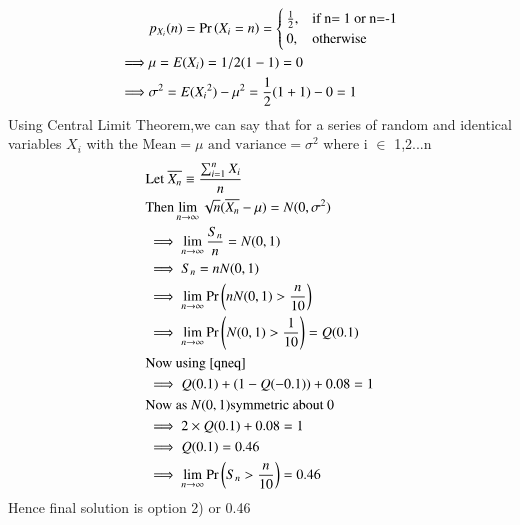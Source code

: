 
\begin{align}
   &p_{X_i} (n)=\Pr\left(X_i = n\right)=\nonumber \begin{cases}
            \frac{1}{2}, &\text{if n= 1 or n=-1}\\
             0, &\text{otherwise}\\
            \end{cases} \\ 
    \implies& \mu=E(X_i)=1/2(1-1)=0\\
    \implies& \sigma^2=E({X_i}^2) -\mu^2=\frac{1}{2}(1+1) -0=1
\end{align}
Using Central Limit Theorem,we can say that for a series of random and identical variables \(X_i\) with the \(\text{Mean} =\mu \text{ and variance}=\sigma^2  \)  where i \(\in\) {1,2...n} 
\begin{align}
&\text{Let }\overline{X_n} \equiv \frac{\sum_{i=1}^n X_i}{n}\\
&\text{Then} \lim_{n\to\infty}\sqrt{n}(\overline{X_n}-\mu)=N(0,\sigma^2)\\
&\implies\lim_{n\to\infty}\frac{S_n}{n}=N(0,1)\\
&\implies S_n=n N(0,1)\\
&\implies\lim_{n\to\infty}\Pr\left(n N(0,1) >\frac{n}{10}\right)\\
&\implies\lim_{n\to\infty} \Pr\left(N(0,1)>\frac{1}{10}\right)= Q(0.1)\\ \nonumber
&\text{Now using \eqref{qneq}}\\ 
&\implies Q(0.1)+(1-Q(-0.1))+ 0.08=1\\ \nonumber
&\text{Now as }N(0,1) \text{symmetric about 0}\\
&\implies 2\times Q(0.1)+0.08=1\\
&\implies Q(0.1)=0.46\\
&\implies \lim_{n\to\infty} \Pr\left(S_n >\frac{n}{10}\right)=0.46 
\end{align}
Hence final solution is option 2) or 0.46